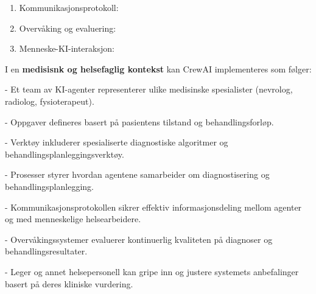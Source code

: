 \begin{enumerate}
\item Kommunikasjonsprotokoll:
\item Overvåking og evaluering:
\item Menneske-KI-interaksjon:
\end{enumerate}

\noindent I en \textbf{medisisnk og helsefaglig kontekst} kan CrewAI implementeres som følger:

\begin{nobullets}
\item - Et team av KI-agenter representerer ulike medisinske spesialister (nevrolog, radiolog, fysioterapeut).
\item - Oppgaver defineres basert på pasientens tilstand og behandlingsforløp.
\item - Verktøy inkluderer spesialiserte diagnostiske algoritmer og behandlingsplanleggingsverktøy.
\item - Prosesser styrer hvordan agentene samarbeider om diagnostisering og behandlingsplanlegging.
\item - Kommunikasjonsprotokollen sikrer effektiv informasjonsdeling mellom agenter og med menneskelige helsearbeidere.
\item - Overvåkingssystemer evaluerer kontinuerlig kvaliteten på diagnoser og behandlingsresultater.
\item - Leger og annet helsepersonell kan gripe inn og justere systemets anbefalinger basert på deres kliniske vurdering.
\end{nobullets}

